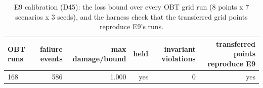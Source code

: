 \begin{table}[t]
\centering
\small
\caption{E9 calibration (D45): the loss bound over every OBT grid run (8 points x 7 scenarios x 3 seeds), and the harness check that the transferred grid points reproduce E9's runs.}
\label{tab:e9_calibration_bound}
\begin{tabular}{lrrrrr}
\toprule
OBT runs & failure events & max damage/bound & held & invariant violations & transferred points reproduce E9 \\
\midrule
168 & 586 & 1.000 & yes & 0 & yes \\
\bottomrule
\end{tabular}
\end{table}
